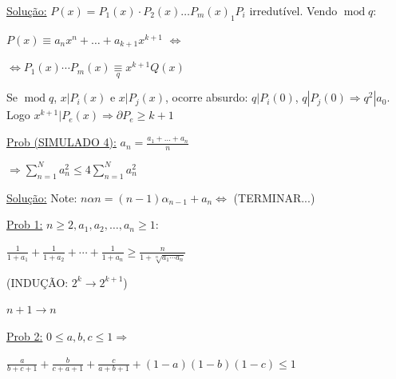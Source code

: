\documentclass[a4paper,12pt]{article}
\renewcommand{\leq}{\ensuremath{\leqslant}}
\renewcommand{\geq}{\ensuremath{\geqslant}}
\theoremstyle{plain} %
\theoremstyle{definition} %
\theoremstyle{remark} %
\begin{document}
	\begin{framed}
		\underline{Solu\c{c}\~ao:} $P(x)=P_{1}(x) \cdot P_{2}(x) \ldots P_{m}(x)_{1} P_{i}$ irredut\'ivel. Vendo $\operatorname{mod} q$: 
		
		\begin{center}
			$ P(x) \equiv a_{n} x^{n}+\ldots+a_{k+1} x^{k+1}$ $\Leftrightarrow$
		\end{center}
		
		$\Leftrightarrow P_{1}(x) \cdots P_{m}(x) \underset{q}{\equiv} x^{k+1} Q(x)$
		
		Se $\operatorname{mod} q$, $x|P_{i}(x)$ e $x| P_{j}(x)$, ocorre absurdo: $q|P_i(0)$, $q|P_j(0) \Rightarrow q^2|a_0$. Logo $x^{k+1}|P_e(x)\Rightarrow \partial P_e \geq k+1$ \tiny\textblock
		
		\normalsize
		
	\end{framed}
	
	\vspace{2ex}\underline{Prob (SIMULADO 4):} $a_{n}=\displaystyle\frac{a_{1}+\ldots +a_{n}}{n}$
	
	\begin{center}
		$\Rightarrow \sum\limits_{n=1}^{N} a_{n}^{2} \leqslant 4 \sum\limits_{n=1}^{N} a_{n}^{2}$
	\end{center}
	
	\begin{framed}
		\underline{Solu\c{c}\~ao:} Note: $n\alpha n=(n-1)\alpha_{n-1}+a_n\Leftrightarrow$ (TERMINAR...)
	\end{framed}
	
	\newpage
	\vspace{2ex}\underline{Prob 1:} $n\geq 2, a_1, a_2, \dotso, a_n\geq 1$:
	
	\begin{center}
		$\displaystyle\frac{1}{1+a_{1}}+\frac{1}{1+a_{2}}+\cdots+\frac{1}{1+a_{n}} \geqslant \frac{n}{1+\sqrt[n]{a_{1} \cdots a_{n}}}$
	\end{center}
	
	(INDU\c{C}\~AO: $2^k\rightarrow2^{k+1}$)
	
	$n+1\rightarrow n$
	
	\vspace{2ex}\underline{Prob 2:} $0\leq a, b, c \leq 1\Rightarrow$
	
	\begin{center}
		$\displaystyle\frac{a}{b+c+1}+\frac{b}{c+a+1}+\frac{c}{a+b+1}+(1-a)(1-b)(1-c) \leq 1$
	\end{center}
	
\end{document}
